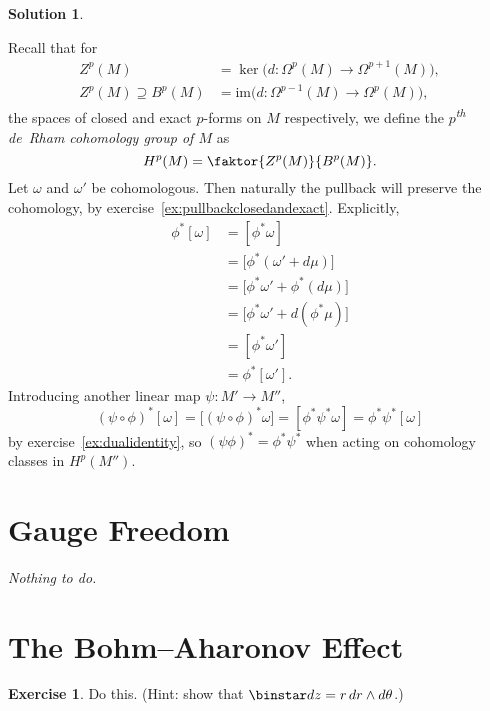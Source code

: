 \documentclass[11pt, a4paper]{report}
\theoremstyle{definition}
\newtheorem{exercise}{Exercise}[part]
\newtheorem{solution}{Solution}[part]
\newenvironment{ex}{\begin{exercise}}{\end{exercise}\pagebreak[1]}
\newenvironment{sol}{\begin{solution}}{\end{solution}\pagebreak[3]}
\newcommand*{\op}[1]{\ensuremath\mathop{}\mathopen{}#1}
\renewcommand*{\d}{\op{d}}
\renewcommand*{\star}{\op{\binstar}\mathord{}}
\begin{document}
\begin{sol}\label{sol:pullbackcohomology}

Recall that for
\begin{align*}
    Z^p(M) &= \ker \bigl( d: \Omega^p(M) \to \Omega^{p + 1}(M) \bigr), \\
    Z^p(M) \supseteq B^p(M) &= \text{im} \bigl( d: \Omega^{p - 1}(M) \to \Omega^p(M) \bigr),
\end{align*}
the spaces of closed and exact $p$-forms on $M$ respectively, we define the \emph{$p$\textsuperscript{th} de~Rham cohomology group of $M$} as
\[
    H^p(M) = \faktor{Z^p(M)}{B^p(M)}.
\]
Let $\omega$ and $\omega'$ be cohomologous. Then naturally the pullback will preserve the cohomology, by exercise~\ref{ex:pullbackclosedandexact}. Explicitly,
\begin{align*}
    \phi^*[\omega] &= [\phi^* \omega] \\
                   &= \bigl[ \phi^*(\omega' + d\mu) \bigr] \\
                   &= \bigl[ \phi^* \omega' + \phi^* (d\mu) \bigr] \\
                   &= \bigl[ \phi^* \omega' + d(\phi^*\mu) \bigr] \\
                   &= [\phi^* \omega'] \\
                   &= \phi^* [\omega'].
\end{align*}
Introducing another linear map $\psi: M' \to M''$,
\[
    {(\psi \circ \phi)}^*[\omega] = \bigl[ {(\psi \circ \phi)}^* \omega \bigr]
                                  = [\phi^* \psi^* \omega]
                                  = \phi^* \psi^* [\omega]
\]
by exercise~\ref{ex:dualidentity}, so ${(\psi \phi)}^* = \phi^* \psi^*$ when acting on cohomology classes in $H^p(M'')$.

\end{sol}

\section{Gauge Freedom}

\emph{Nothing to do.}

\section{The Bohm--Aharonov Effect}

\begin{ex}

Do this. (Hint: show that $\star dz = r \d r \wedge d\theta$.)

\end{ex}
\end{document}

